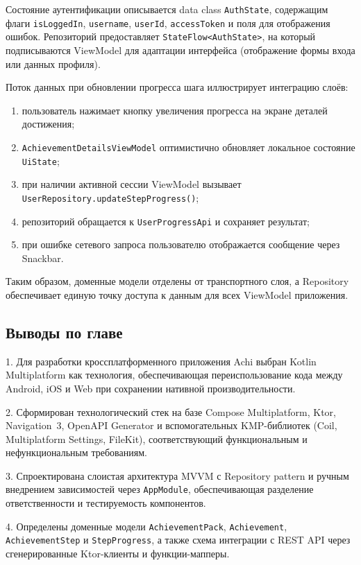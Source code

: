 \documentclass[../main.tex]{subfiles}
\begin{document}
Состояние аутентификации описывается data class \texttt{AuthState}, содержащим флаги \texttt{isLoggedIn}, \texttt{username}, \texttt{userId}, \texttt{accessToken} и поля для отображения ошибок. Репозиторий предоставляет \texttt{StateFlow<AuthState>}, на который подписываются ViewModel для адаптации интерфейса (отображение формы входа или данных профиля).

Поток данных при обновлении прогресса шага иллюстрирует интеграцию слоёв:
\begin{enumerate}[leftmargin=*]
	\item пользователь нажимает кнопку увеличения прогресса на экране деталей достижения;
	\item \texttt{AchievementDetailsViewModel} оптимистично обновляет локальное состояние \texttt{UiState};
	\item при наличии активной сессии ViewModel вызывает \texttt{UserRepository.updateStepProgress()};
	\item репозиторий обращается к \texttt{UserProgressApi} и сохраняет результат;
	\item при ошибке сетевого запроса пользователю отображается сообщение через Snackbar.
\end{enumerate}

Таким образом, доменные модели отделены от транспортного слоя, а Repository обеспечивает единую точку доступа к данным для всех ViewModel приложения.

\subsection{Выводы по главе}

1. Для разработки кроссплатформенного приложения Achi выбран Kotlin Multiplatform как технология, обеспечивающая переиспользование кода между Android, iOS и Web при сохранении нативной производительности.

2. Сформирован технологический стек на базе Compose Multiplatform, Ktor, Navigation~3, OpenAPI Generator и вспомогательных KMP-библиотек (Coil, Multiplatform Settings, FileKit), соответствующий функциональным и нефункциональным требованиям.

3. Спроектирована слоистая архитектура MVVM с Repository pattern и ручным внедрением зависимостей через \texttt{AppModule}, обеспечивающая разделение ответственности и тестируемость компонентов.

4. Определены доменные модели \texttt{AchievementPack}, \texttt{Achievement}, \texttt{AchievementStep} и \texttt{StepProgress}, а также схема интеграции с REST API через сгенерированные Ktor-клиенты и функции-мапперы.
\end{document}
